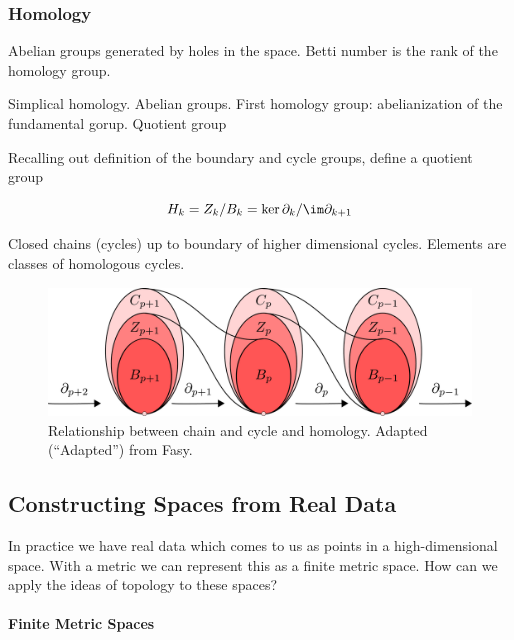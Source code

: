 \begin{figure}
\centering
\caption[]{}
\label{background:fig:boundary_example}
\end{figure}

\subsubsection{Homology}

Abelian groups generated by holes in the space.
Betti number is the rank of the homology group.

Simplical homology.
Abelian groups.
First homology group: abelianization of the fundamental gorup.
Quotient group

Recalling out definition of the boundary and cycle groups, define a quotient group

\begin{equation}
H_{k} = Z_{k} / B_{k} = \ker\partial_{k} / \im\partial_{k+1}
\end{equation}

Closed chains (cycles) up to boundary of higher dimensional cycles.
Elements are classes of homologous cycles.

\begin{figure}
\centering\includegraphics[width=\columnwidth]{./fig/FASY_chain_complexes.pdf}
\caption{Relationship between chain and cycle and homology. Adapted (``Adapted'') from Fasy.}
\label{fig:chain_complexes}
\end{figure}


\subsection{Constructing Spaces from Real Data}

In practice we have real data which comes to us as points in a high-dimensional space.
With a metric we can represent this as a finite metric space.
How can we apply the ideas of topology to these spaces?

\paragraph{Finite Metric Spaces}

